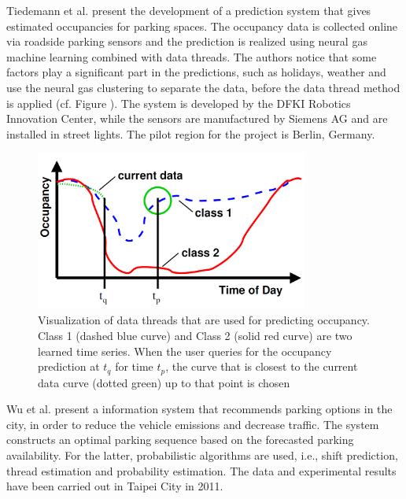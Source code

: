 Tiedemann et al. \cite{tiedemann} present the development of a prediction system that gives estimated occupancies for parking spaces. The occupancy data is collected online via roadside parking sensors and the prediction is realized using neural gas machine learning combined with data threads. The authors notice that some factors play a significant part in the predictions, such as holidays, weather and use the neural gas clustering to separate the data, before the data thread method is applied (cf. Figure ). The system is developed by the DFKI Robotics Innovation Center, while the sensors are manufactured by Siemens AG and are installed in street lights. The pilot region for the project is Berlin, Germany.

\begin{figure}[!ht]
	\centering
	\includegraphics[width=0.8\textwidth]{graphics/related_work/tiedemann_1.png}
	\caption{Visualization of data threads that are used for predicting occupancy. Class 1 (dashed blue curve) and Class 2 (solid red curve) are two learned time series. When the user queries for the occupancy prediction at $t_q$ for time $t_p$, the curve that is closest to the current data curve (dotted green) up to that point is chosen} %
	\label{fig:related_work_tiedemann}
\end{figure}

Wu et al. \cite{wu} present a information system that recommends parking options in the city, in order to reduce the vehicle emissions and decrease traffic. The system constructs an optimal parking sequence based on the forecasted parking availability. For the latter, probabilistic algorithms are used, i.e., shift prediction, thread estimation and probability estimation. The data and experimental results have been carried out in Taipei City in 2011.


